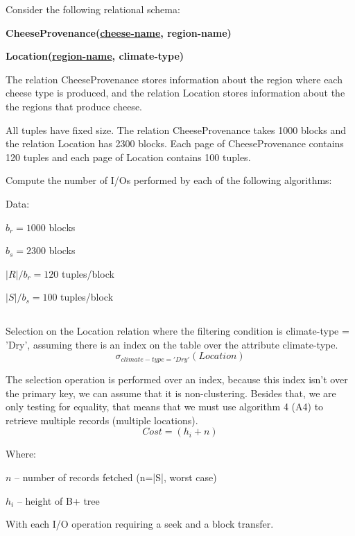 {\color{gray}Consider the following relational schema:}
	
	\textbf{\color{gray}\tab CheeseProvenance(\underline{cheese-name}, region-name)}

	\textbf{\color{gray}\tab Location(\underline{region-name}, climate-type)}

{\color{gray}The relation CheeseProvenance stores information about the region where each cheese type is produced, and the relation Location stores information about the the regions that produce cheese.}

{\color{gray}All tuples have fixed size. The relation CheeseProvenance takes 1000 blocks and the relation Location has 2300 blocks. Each page of CheeseProvenance contains 120 tuples and each page of Location contains 100 tuples.}

{\color{gray} Compute the number of I/Os performed by each of the following algorithms:}

	Data:

	\tab $b_r = 1000$ blocks

	\tab $b_s = 2300$ blocks

	\tab $|R|/b_r = 120$ tuples/block

	\tab $|S|/b_s = 100$ tuples/block


	\subsection{}
	{\color{gray} Selection on the Location relation where the filtering condition is climate-type = 'Dry', assuming there is an index on the table over the attribute climate-type.}
	\begin{equation}\sigma_{climate-type='Dry'}(Location)\end{equation}

	The selection operation is performed over an index, because this index isn't over the primary key, we can assume that it is non-clustering. Besides that, we are only testing for equality, that means that we must use algorithm 4 (A4) to retrieve multiple records (multiple locations).
	\begin{equation}Cost = (h_i + n) \end{equation}
		
	Where:

	\tab $n$ – number of records fetched (n=|S|, worst case)

	\tab $h_i$ – height of B+ tree

	With each I/O operation requiring a seek and a block transfer.

